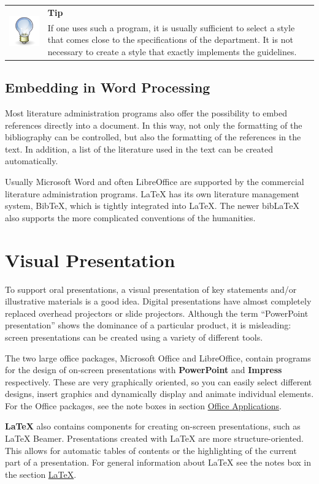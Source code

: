 \documentclass[
  english,
]{scrreprt}
\newlength{\iconwidth}
\newenvironment{displaybox}[2]{%
    \begin{center}
        \setlength\arrayrulewidth{0.75pt}%
        \arrayrulecolor{white}%
        \renewcommand{\arraystretch}{1.3}%
        \begin{tabular}{p{\iconwidth}p{\linewidth-4\tabcolsep-\iconwidth}}
            \multirow{2}{*}{#2}&\cellcolor{boxheadcol}\textbf{\sffamily\color{white}#1} \\%
            \hhline{~-}%
            &\cellcolor{boxcol}%
}{%
            \\
        \end{tabular}
        \arrayrulecolor{black}
    \end{center}
}
\newenvironment{Tip}{%
\begin{displaybox}{Tip}{\includegraphics[width=\iconwidth]{images/icon-tipp}}}%
{\end{displaybox}}
\begin{document}
\begin{Tip}

If one uses such a program, it is usually sufficient to select a style that comes close to the specifications of the department. It is not necessary to create a style that exactly implements the guidelines.

\end{Tip}

\section{Embedding in Word Processing}\label{embedding-in-word-processing}

Most literature administration programs also offer the possibility to embed references directly into a document. In this way, not only the formatting of the bibliography can be controlled, but also the formatting of the references in the text. In addition, a list of the literature used in the text can be created automatically.

Usually Microsoft Word and often LibreOffice are supported by the commercial literature administration programs. LaTeX has its own literature management system, BibTeX, which is tightly integrated into LaTeX. The newer bibLaTeX also supports the more complicated conventions of the humanities.

\chapter{Visual Presentation}\label{sec:visual_presentation}

To support oral presentations, a visual presentation of key statements and/or illustrative materials is a good idea. Digital presentations have almost completely replaced overhead projectors or slide projectors. Although the term “PowerPoint presentation” shows the dominance of a particular product, it is misleading: screen presentations can be created using a variety of different tools.

The two large office packages, Microsoft Office and LibreOffice, contain programs for the design of on-screen presentations with \textbf{PowerPoint} and \textbf{Impress} respectively. These are very graphically oriented, so you can easily select different designs, insert graphics and dynamically display and animate individual elements. For the Office packages, see the note boxes in section \hyperref[sec:office]{Office Applications}.

\textbf{LaTeX} also contains components for creating on-screen presentations, such as LaTeX Beamer. Presentations created with LaTeX are more structure-oriented. This allows for automatic tables of contents or the highlighting of the current part of a presentation. For general information about LaTeX see the notes box in the section \hyperref[sec:latex]{LaTeX}.
\end{document}
